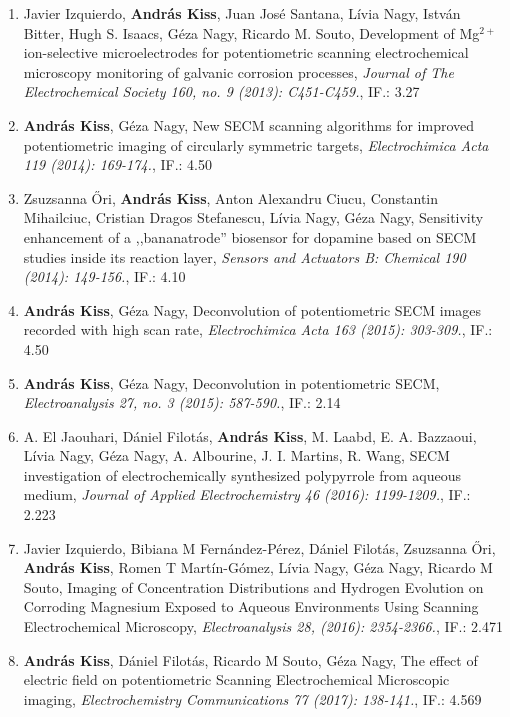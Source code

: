 \documentclass[11pt,a4paper,roman]{article}
\begin{document}
\begin{enumerate}
\item Javier Izquierdo, \textbf{András Kiss}, Juan José Santana, Lívia Nagy, István Bitter, Hugh S. Isaacs, Géza Nagy, Ricardo M. Souto, Development of Mg$^{2+}$ ion-selective microelectrodes for potentiometric scanning electrochemical microscopy monitoring of galvanic corrosion processes, \emph{Journal of The Electrochemical Society 160, no. 9 (2013): C451-C459.}, IF.: 3.27

\item \textbf{András Kiss}, Géza Nagy, New SECM scanning algorithms for improved potentiometric imaging of circularly symmetric targets, \emph{Electrochimica Acta 119 (2014): 169-174.}, IF.: 4.50


\item Zsuzsanna \H{O}ri, \textbf{András Kiss}, Anton Alexandru Ciucu, Constantin Mihailciuc, Cristian Dragos Stefanescu, Lívia Nagy, Géza Nagy, Sensitivity enhancement of a ,,bananatrode'' biosensor for dopamine based on SECM studies inside its reaction layer, \emph{Sensors and Actuators B: Chemical 190 (2014): 149-156.}, IF.: 4.10

\item \textbf{András Kiss}, Géza Nagy, Deconvolution of potentiometric SECM images recorded with high scan rate, \emph{Electrochimica Acta 163 (2015): 303-309.}, IF.: 4.50

\item \textbf{András Kiss}, Géza Nagy, Deconvolution in potentiometric SECM, \emph{Electroanalysis 27, no. 3 (2015): 587-590.}, IF.: 2.14


\item A. El Jaouhari,  Dániel Filotás, \textbf{András Kiss}, M. Laabd, E. A. Bazzaoui, Lívia Nagy, Géza Nagy, A. Albourine, J. I. Martins, R. Wang, SECM investigation of electrochemically synthesized polypyrrole from aqueous medium, \emph{Journal of Applied Electrochemistry 46 (2016): 1199-1209.}, IF.: 2.223


\item Javier Izquierdo, Bibiana M Fernández-Pérez, Dániel Filotás, Zsuzsanna Őri, \textbf{András Kiss}, Romen T Martín-Gómez, Lívia Nagy, Géza Nagy, Ricardo M Souto, Imaging of Concentration Distributions and Hydrogen Evolution on Corroding Magnesium Exposed to Aqueous Environments Using Scanning Electrochemical Microscopy, \emph{Electroanalysis 28, (2016): 2354-2366.}, IF.: 2.471

\item \textbf{András Kiss}, Dániel Filotás, Ricardo M Souto, Géza Nagy, The effect of electric field on potentiometric Scanning Electrochemical Microscopic imaging, \emph{Electrochemistry Communications 77 (2017): 138-141.}, IF.: 4.569







\end{enumerate}
\end{document}
